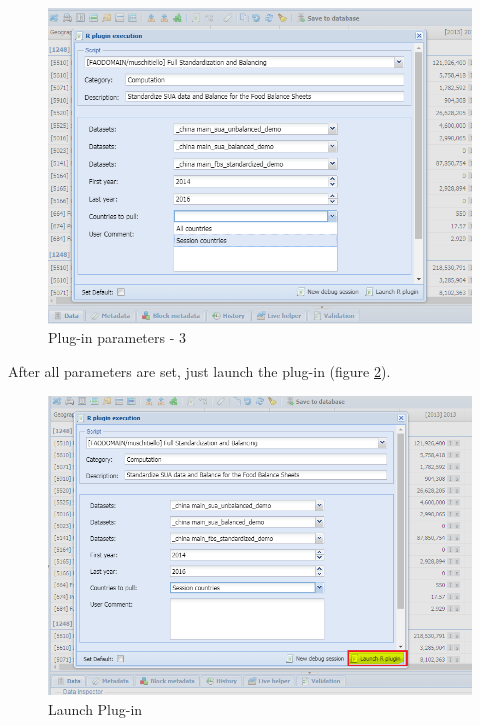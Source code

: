 \documentclass[]{article}
\begin{document}
\begin{figure}[H]

{\centering \includegraphics[width=1\linewidth]{images/standPlugin/28_parametersPI3} 

}

\caption{\label{fig:f29}Plug-in parameters - 3}\label{fig:f29}
\end{figure}

After all parameters are set, just launch the plug-in (figure
\ref{fig:f30}).

\begin{figure}[H]

{\centering \includegraphics[width=1\linewidth]{images/standPlugin/29_launch} 

}

\caption{\label{fig:f30}Launch Plug-in}\label{fig:f30}
\end{figure}
\end{document}
